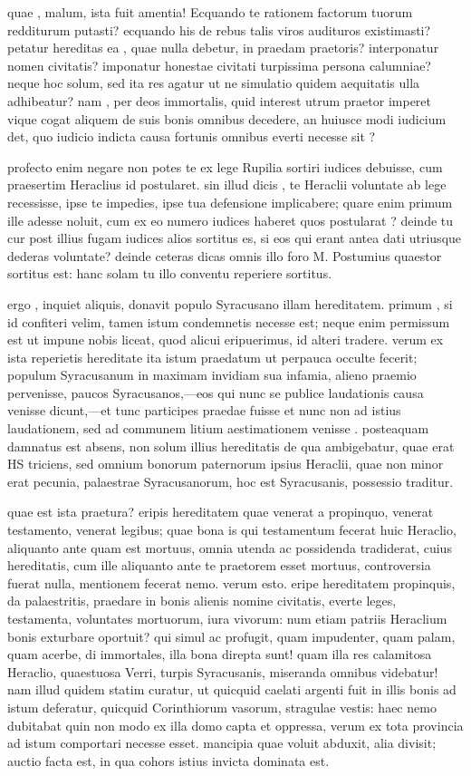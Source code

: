  quae , malum, ista fuit amentia! Ecquando te rationem factorum tuorum redditurum putasti? ecquando his de rebus talis viros audituros existimasti? petatur hereditas ea , quae nulla debetur, in praedam praetoris? interponatur nomen civitatis? imponatur honestae civitati turpissima persona calumniae? neque hoc solum, sed ita res agatur ut ne simulatio quidem aequitatis ulla adhibeatur? nam , per deos immortalis, quid interest utrum praetor imperet vique cogat aliquem de suis bonis omnibus decedere, an huiusce modi iudicium det, quo iudicio indicta causa fortunis omnibus everti necesse sit ?

 profecto enim negare non potes te ex lege Rupilia sortiri iudices debuisse, cum praesertim Heraclius id postularet. sin illud dicis , te Heraclii voluntate ab lege recessisse, ipse te impedies, ipse tua defensione implicabere; quare enim primum ille adesse noluit, cum ex eo numero iudices haberet quos postularat ? deinde tu cur post illius fugam iudices alios sortitus es, si eos qui erant antea dati utriusque dederas voluntate? deinde ceteras dicas omnis illo foro M. Postumius quaestor sortitus est: hanc solam tu illo conventu reperiere sortitus.

 ergo , inquiet aliquis, donavit populo Syracusano illam hereditatem. primum , si id confiteri velim, tamen istum condemnetis necesse est; neque enim permissum est ut impune nobis liceat, quod alicui eripuerimus, id alteri tradere. verum ex ista reperietis hereditate ita istum praedatum ut perpauca occulte fecerit; populum Syracusanum in maximam invidiam sua infamia, alieno praemio pervenisse, paucos Syracusanos,—eos qui nunc se publice laudationis causa venisse dicunt,—et tunc participes praedae fuisse et nunc non ad istius laudationem, sed ad communem litium aestimationem venisse . posteaquam damnatus est absens, non solum illius hereditatis de qua ambigebatur, quae erat HS triciens, sed omnium bonorum paternorum ipsius Heraclii, quae non minor erat pecunia, palaestrae Syracusanorum, hoc est Syracusanis, possessio traditur.

 quae est ista praetura? eripis hereditatem quae venerat a propinquo, venerat testamento, venerat legibus; quae bona is qui testamentum fecerat huic Heraclio, aliquanto ante quam est mortuus, omnia utenda ac possidenda tradiderat, cuius hereditatis, cum ille aliquanto ante te praetorem esset mortuus, controversia fuerat nulla, mentionem fecerat nemo. verum esto. eripe hereditatem propinquis, da palaestritis, praedare in bonis alienis nomine civitatis, everte leges, testamenta, voluntates mortuorum, iura vivorum: num etiam patriis Heraclium bonis exturbare oportuit? qui simul ac profugit, quam impudenter, quam palam, quam acerbe, di immortales, illa bona direpta sunt! quam illa res calamitosa Heraclio, quaestuosa Verri, turpis Syracusanis, miseranda omnibus videbatur! nam illud quidem statim curatur, ut quicquid caelati argenti fuit in illis bonis ad istum deferatur, quicquid Corinthiorum vasorum, stragulae vestis: haec nemo dubitabat quin non modo ex illa domo capta et oppressa, verum ex tota provincia ad istum comportari necesse esset. mancipia quae voluit abduxit, alia divisit; auctio facta est, in qua cohors istius invicta dominata est.

